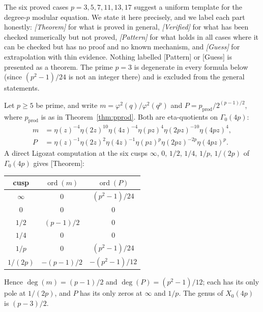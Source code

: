 \documentclass[11pt]{amsart}
\theoremstyle{plain}
\theoremstyle{definition}
\theoremstyle{remark}
\newcommand{\pprod}{p_{\mathrm{prod}}}
\begin{document}
The six proved cases $p = 3, 5, 7, 11, 13, 17$ suggest a uniform template for
the degree-$p$ modular equation. We state it here precisely, and we label each
part honestly: \emph{[Theorem]} for what is proved in general, \emph{[Verified]}
for what has been checked numerically but not proved, \emph{[Pattern]} for what
holds in all cases where it can be checked but has no proof and no known
mechanism, and \emph{[Guess]} for extrapolation with thin evidence. Nothing
labelled [Pattern] or [Guess] is presented as a theorem. The prime $p = 3$ is
degenerate in every formula below (since $(p^2-1)/24$ is not an integer there)
and is excluded from the general statements.

Let $p \geq 5$ be prime, and write $m = \varphi^2(q)/\varphi^2(q^p)$ and
$P = \pprod/2^{(p-1)/2}$, where $\pprod$ is as in Theorem~\ref{thm:pprod}.
Both are eta-quotients on $\Gamma_0(4p)$:
\begin{align}
m &= \eta(z)^{-4}\eta(2z)^{10}\eta(4z)^{-4}\eta(pz)^4\eta(2pz)^{-10}\eta(4pz)^4, \\
P &= \eta(z)^{-1}\eta(2z)^2\eta(4z)^{-1}\eta(pz)^p\eta(2pz)^{-2p}\eta(4pz)^p.
\end{align}
A direct Ligozat computation at the six cusps $\infty$, $0$, $1/2$, $1/4$,
$1/p$, $1/(2p)$ of $\Gamma_0(4p)$ gives [Theorem]:
\begin{center}
\begin{tabular}{c|c|c}
cusp & $\operatorname{ord}(m)$ & $\operatorname{ord}(P)$ \\ \hline
$\infty$ & $0$ & $(p^2-1)/24$ \\
$0$ & $0$ & $0$ \\
$1/2$ & $(p-1)/2$ & $0$ \\
$1/4$ & $0$ & $0$ \\
$1/p$ & $0$ & $(p^2-1)/24$ \\
$1/(2p)$ & $-(p-1)/2$ & $-(p^2-1)/12$
\end{tabular}
\end{center}
Hence $\deg(m) = (p-1)/2$ and $\deg(P) = (p^2-1)/12$; each has its only pole
at $1/(2p)$, and $P$ has its only zeros at $\infty$ and $1/p$. The genus of
$X_0(4p)$ is $(p-3)/2$.
\end{document}

